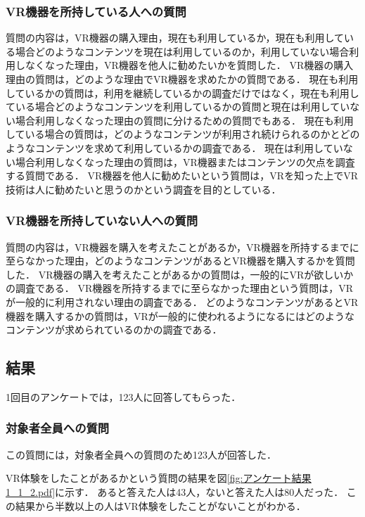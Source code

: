 \documentclass[12pt,a4j]{ltjsarticle}
\begin{document}
\subsubsection{VR機器を所持している人への質問}
質問の内容は，VR機器の購入理由，現在も利用しているか，現在も利用している場合どのようなコンテンツを現在は利用しているのか，利用していない場合利用しなくなった理由，VR機器を他人に勧めたいかを質問した．
VR機器の購入理由の質問は，どのような理由でVR機器を求めたかの質問である．
現在も利用しているかの質問は，利用を継続しているかの調査だけではなく，現在も利用している場合どのようなコンテンツを利用しているかの質問と現在は利用していない場合利用しなくなった理由の質問に分けるための質問でもある．
現在も利用している場合の質問は，どのようなコンテンツが利用され続けられるのかとどのようなコンテンツを求めて利用しているかの調査である．
現在は利用していない場合利用しなくなった理由の質問は，VR機器またはコンテンツの欠点を調査する質問である．
VR機器を他人に勧めたいという質問は，VRを知った上でVR技術は人に勧めたいと思うのかという調査を目的としている．

\subsubsection{VR機器を所持していない人への質問}
質問の内容は，VR機器を購入を考えたことがあるか，VR機器を所持するまでに至らなかった理由，どのようなコンテンツがあるとVR機器を購入するかを質問した．
VR機器の購入を考えたことがあるかの質問は，一般的にVRが欲しいかの調査である．
VR機器を所持するまでに至らなかった理由という質問は，VRが一般的に利用されない理由の調査である．
どのようなコンテンツがあるとVR機器を購入するかの質問は，VRが一般的に使われるようになるにはどのようなコンテンツが求められているのかの調査である．

\subsection{結果}
1回目のアンケートでは，123人に回答してもらった．

\subsubsection{対象者全員への質問}
この質問には，対象者全員への質問のため123人が回答した．

VR体験をしたことがあるかという質問の結果を図\ref{fig:アンケート結果1_1_2.pdf}に示す．
あると答えた人は43人，ないと答えた人は80人だった．
この結果から半数以上の人はVR体験をしたことがないことがわかる．
\end{document}
